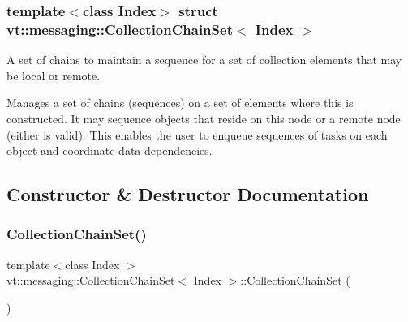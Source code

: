 \subsubsection*{template$<$class Index$>$\newline
struct vt\+::messaging\+::\+Collection\+Chain\+Set$<$ Index $>$}

A set of chains to maintain a sequence for a set of collection elements that may be local or remote. 

Manages a set of chains (sequences) on a set of elements where this is constructed. It may sequence objects that reside on this node or a remote node (either is valid). This enables the user to enqueue sequences of tasks on each object and coordinate data dependencies. 

\subsection{Constructor \& Destructor Documentation}
\mbox{\label{classvt_1_1messaging_1_1_collection_chain_set_aeb43ad4a2e46ea059817b639b72ddb3b}} 
\subsubsection{\texorpdfstring{Collection\+Chain\+Set()}{CollectionChainSet()}\hspace{0.1cm}{\footnotesize\ttfamily [1/3]}}
{\footnotesize\ttfamily template$<$class Index $>$ \\
\hyperlink{classvt_1_1messaging_1_1_collection_chain_set}{vt\+::messaging\+::\+Collection\+Chain\+Set}$<$ Index $>$\+::\hyperlink{classvt_1_1messaging_1_1_collection_chain_set}{Collection\+Chain\+Set} (\begin{DoxyParamCaption}{ }\end{DoxyParamCaption})\hspace{0.3cm}{\ttfamily [default]}}

\mbox{\label{classvt_1_1messaging_1_1_collection_chain_set_a71328cb5c03210ffdb0bd5dd5f3b6797}} 
